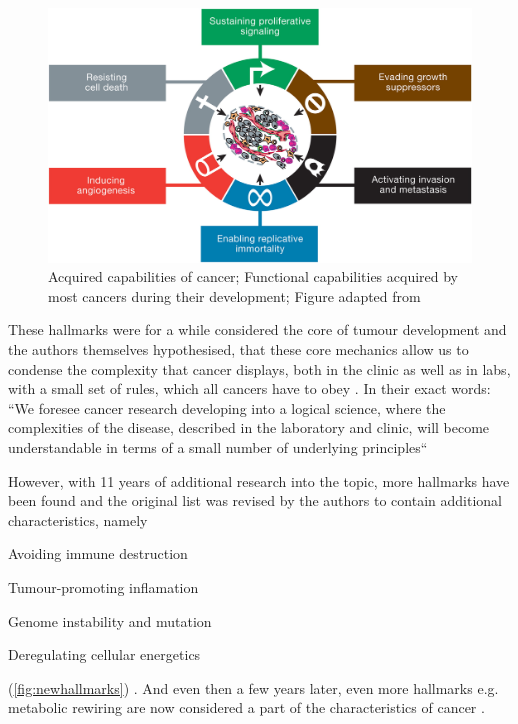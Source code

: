 \begin{figure}[!ht]
\centering
\includegraphics[width=.95\linewidth]{Figures/oldHallmarksCancer.jpg}
\caption[Original hallmarks of cancer]{Acquired capabilities of cancer; Functional capabilities acquired by most cancers during their development; Figure adapted from \protect\citeauthor*{Hanahan2000}\protect\cite{Hanahan2000}}\label{fig:oldhallmarks}
\end{figure}


These hallmarks were for a while considered the core of tumour development and the authors themselves hypothesised, that these core mechanics allow us to condense the complexity that cancer displays, both in the clinic as well as in labs, with a small set of rules, which all cancers have to obey \cite{Hanahan2000}. In their exact words: ``We foresee cancer research developing into a logical science, where the complexities of the disease, described in the laboratory and clinic, will become understandable in terms of a small number of underlying principles``

However, with 11 years of additional research into the topic, more hallmarks have been found and the original list was revised by the authors to contain additional characteristics, namely 
\begin{enumerate*}
\item Avoiding immune destruction
\item Tumour-promoting inflamation
\item Genome instability and mutation
\item Deregulating cellular energetics
\end{enumerate*}
(\autoref{fig:newhallmarks}) \cite{Hanahan2011}. And even then a few years later, even more hallmarks e.g. metabolic rewiring are now considered a part of the characteristics of cancer \cite{Fouad2017}.

